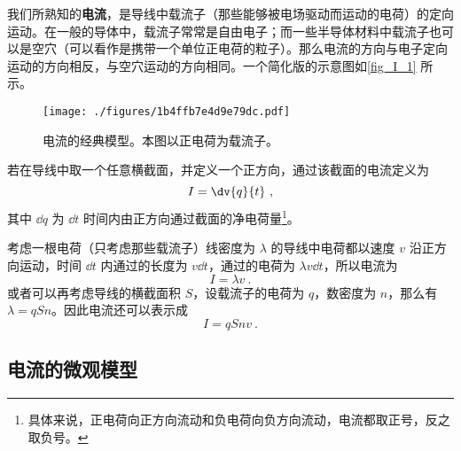 
\begin{issues}
\issueDraft
\end{issues}


我们所熟知的\textbf{电流}，是导线中载流子（那些能够被电场驱动而运动的电荷）的定向运动。在一般的导体中，载流子常常是自由电子；而一些半导体材料中载流子也可以是空穴（可以看作是携带一个单位正电荷的粒子）。那么电流的方向与电子定向运动的方向相反，与空穴运动的方向相同。一个简化版的示意图如\autoref{fig_I_1} 所示。
\begin{figure}[ht]
\centering
\texttt{[image: ./figures/1b4ffb7e4d9e79dc.pdf]}
\caption{电流的经典模型。本图以正电荷为载流子。} \label{fig_I_1}
\end{figure}

若在导线中取一个任意横截面，并定义一个正方向，通过该截面的电流定义为
\begin{equation}\label{eq_I_1}
I = \dv{q}{t}~,
\end{equation}
其中 $\dd{q}$ 为 $\dd{t}$ 时间内由正方向通过截面的净电荷量\footnote{具体来说，正电荷向正方向流动和负电荷向负方向流动，电流都取正号，反之取负号。}。

考虑一根电荷（只考虑那些载流子）线密度为 $\lambda$ 的导线中电荷都以速度 $v$ 沿正方向运动，时间 $\dd{t}$ 内通过的长度为 $v\dd{t}$，通过的电荷为 $\lambda v\dd{t}$，所以电流为
\begin{equation}
I = \lambda v~.
\end{equation}
或者可以再考虑导线的横截面积 $S$，设载流子的电荷为 $q$，数密度为 $n$，那么有 $\lambda = q S n$。因此电流还可以表示成
\begin{equation}
I = q Snv~.
\end{equation}
\subsection{电流的微观模型}
